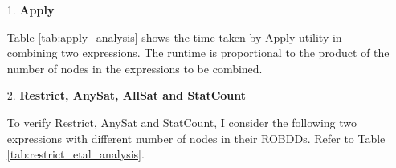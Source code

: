 \documentclass[a4paper, titlepage, 12pt]{article}
\numberwithin{equation}{section}
\begin{document}
            \begin{itemize}
                \item[1.] \textbf{Apply}
                    
                    Table \ref{tab:apply_analysis} shows the time taken by Apply utility in combining two expressions.
                    The runtime is proportional to the product of the number of nodes in the expressions to be combined.
                    
                    \begin{table}[!tbh]
                        \centering
                        \caption{Time analysis of Apply.}
                        \label{tab:apply_analysis}
                    \end{table}


                \item[2.] \textbf{Restrict, AnySat, AllSat and StatCount}
                
                    To verify Restrict, AnySat and StatCount, I consider the following two expressions with different number of nodes in their ROBDDs.
                    Refer to Table \ref{tab:restrict_etal_analysis}.
                    

\end{itemize}
\end{document}

